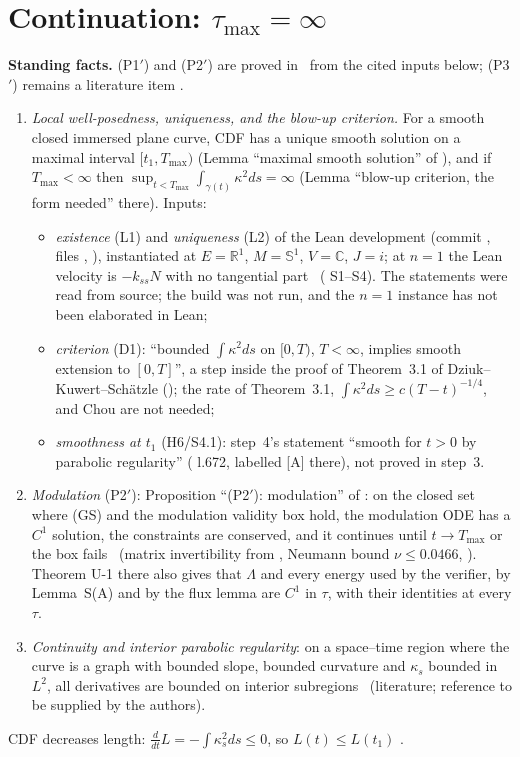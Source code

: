 \documentclass[11pt]{article}
\begin{document}
\section{Continuation: $\tau_{\max}=\infty$}\label{C:sec:cont}
\noindent\textbf{Standing facts.} (P1$'$) and (P2$'$) are proved in  \tH\ from the cited inputs below; (P3$'$) remains a literature item \tH.
\begin{enumerate}[label=(P\arabic*$'$),leftmargin=3em]
\item \emph{Local well-posedness, uniqueness, and the blow-up criterion.} For a smooth closed immersed plane curve, CDF has a unique smooth solution on a maximal interval $[t_1,T_{\max})$ (Lemma ``maximal smooth solution'' of ), and if $T_{\max}<\infty$ then $\sup_{t<T_{\max}}\int_{\gamma(t)}\kappa^2ds=\infty$ (Lemma ``blow-up criterion, the form needed'' there). Inputs:
  \begin{itemize}[leftmargin=*]
  \item \emph{existence} (L1)  and \emph{uniqueness} (L2)  of the Lean development  \cite{CWFlow} (commit , files , ), instantiated at $E=\mathbb R^1$, $M=\mathbb S^1$, $V=\mathbb C$, $J=i$; at $n=1$ the Lean velocity is $-k_{ss}N$ with no tangential part \tS\ ( S1--S4). The statements were read from source; the build was not run, and the $n=1$ instance has not been elaborated in Lean;
  \item \emph{criterion} (D1): ``bounded $\int\kappa^2ds$ on $[0,T)$, $T<\infty$, implies smooth extension to $[0,T]$'', a step inside the proof of Theorem~3.1 of Dziuk--Kuwert--Sch\"atzle \cite{DKS2002} (); the rate of Theorem~3.1, $\int\kappa^2ds\ge c(T-t)^{-1/4}$, and Chou \cite{Chou2003} are not needed;
  \item \emph{smoothness at $t_1$} (H6/S4.1): step~4's statement ``smooth for $t>0$ by parabolic regularity'' ( l.672, labelled [A] there), not proved in step~3.
  \end{itemize}
\item \emph{Modulation} (P2$'$): Proposition ``(P2$'$): modulation'' of : on the closed set where (GS) and the modulation validity box hold, the modulation ODE has a $C^1$ solution, the constraints are conserved, and it continues until $t\to T_{\max}$ or the box fails \tH\ (matrix invertibility from , Neumann bound $\nu\le0.0466$, \tR). Theorem U-1 there also gives that $\Lambda$ and every energy used by the verifier, by Lemma~S(A) and by the flux lemma are $C^1$ in $\tau$, with their identities at every $\tau$.
\item \emph{Continuity and interior parabolic regularity}: on a space--time region where the curve is a graph with bounded slope, bounded curvature and $\kappa_s$ bounded in $L^2$, all derivatives are bounded on interior subregions \tH\ (literature; reference to be supplied by the authors).
\end{enumerate}
CDF decreases length: $\frac{d}{dt}L=-\int\kappa_s^2ds\le0$, so $L(t)\le L(t_1)$ \tP.
\end{document}
